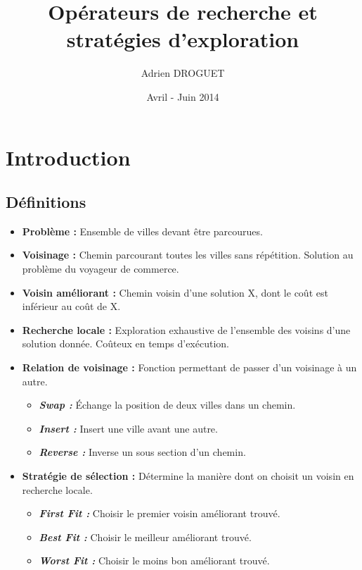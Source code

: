 \documentclass[a4paper,10pt]{report}
\title{Opérateurs de recherche et stratégies d'exploration}
\author{Adrien DROGUET}
\date{Avril - Juin 2014}
\begin{document}
\maketitle

\tableofcontents
\pagebreak

\chapter*{Introduction}
\section*{Définitions}
\begin{itemize}
 \item \textbf{Problème :} Ensemble de villes devant être parcourues.
 \item \textbf{Voisinage :} Chemin parcourant toutes les villes sans répétition.
Solution au problème du voyageur de commerce.
 \item \textbf{Voisin améliorant :} Chemin voisin d'une solution X, dont le coût
est inférieur au coût de X.
 \item \textbf{Recherche locale :} Exploration exhaustive de l'ensemble des
voisins d'une solution donnée.
 Coûteux en temps d'exécution.
 \item \textbf{Relation de voisinage :} Fonction permettant de passer d'un
voisinage à un autre.
 \begin{itemize}
  \item \textit{\textbf{Swap :}} Échange la position de deux villes dans un
chemin.
  \item \textit{\textbf{Insert :}} Insert une ville avant une autre.
  \item \textit{\textbf{Reverse :}} Inverse un sous section d'un chemin.
 \end{itemize}
 \item \textbf{Stratégie de sélection :} Détermine la manière dont on choisit un
voisin en recherche locale.
 \begin{itemize}
  \item \textit{\textbf{First Fit :}} Choisir le premier voisin améliorant
trouvé.
  \item \textit{\textbf{Best Fit :}} Choisir le meilleur améliorant trouvé.
  \item \textit{\textbf{Worst Fit :}} Choisir le moins bon améliorant trouvé.
 \end{itemize}
\end{itemize}
\end{document}
